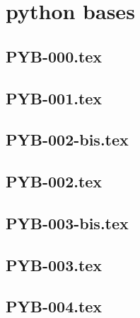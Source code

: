 \section*{python bases}
\renewcommand{\xxexo}{PYB-000.tex} 
\subsection*{\xxexo} 
\graphicspath{{../../exos/python_bases/PYB-000/}}
 
 
\renewcommand{\xxexo}{PYB-001.tex} 
\subsection*{\xxexo} 
\graphicspath{{../../exos/python_bases/PYB-001/}}
 
 
\renewcommand{\xxexo}{PYB-002-bis.tex} 
\subsection*{\xxexo} 
\graphicspath{{../../exos/python_bases/PYB-002-bis/}}
 
 
\renewcommand{\xxexo}{PYB-002.tex} 
\subsection*{\xxexo} 
\graphicspath{{../../exos/python_bases/PYB-002/}}
 
 
\renewcommand{\xxexo}{PYB-003-bis.tex} 
\subsection*{\xxexo} 
\graphicspath{{../../exos/python_bases/PYB-003-bis/}}
 
 
\renewcommand{\xxexo}{PYB-003.tex} 
\subsection*{\xxexo} 
\graphicspath{{../../exos/python_bases/PYB-003/}}
 
 
\renewcommand{\xxexo}{PYB-004.tex} 
\subsection*{\xxexo} 
\graphicspath{{../../exos/python_bases/PYB-004/}}
 
 
